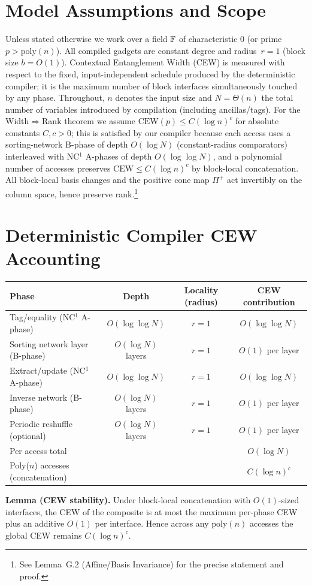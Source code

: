 \documentclass[12pt]{article}
\theoremstyle{definition}
\theoremstyle{definition}
\theoremstyle{remark}
\theoremstyle{remark}
\begin{document}

\section*{Model Assumptions and Scope}
Unless stated otherwise we work over a field $\Bbb F$ of characteristic $0$ (or prime $p>\mathrm{poly}(n)$).
All compiled gadgets are constant degree and radius~$r=1$ (block size $b=O(1)$).
Contextual Entanglement Width (CEW) is measured with respect to the fixed, input-independent schedule produced by the deterministic compiler; it is the maximum number of block interfaces simultaneously touched by any phase.
Throughout, $n$ denotes the input size and $N=\Theta(n)$ the total number of variables introduced by compilation (including ancillas/tags).
For the Width$\Rightarrow$Rank theorem we assume $\mathrm{CEW}(p)\le C(\log n)^c$ for absolute constants $C,c>0$; this is satisfied by our compiler because each access uses a sorting-network B-phase of depth $O(\log N)$ (constant-radius comparators) interleaved with NC$^1$ A-phases of depth $O(\log\log N)$, and a polynomial number of accesses preserves $\mathrm{CEW}\le C(\log n)^c$ by block-local concatenation.
All block-local basis changes and the positive cone map $\Pi^+$ act invertibly on the column space, hence preserve rank.\footnote{See Lemma~G.2 (Affine/Basis Invariance) for the precise statement and proof.}

\section*{Deterministic Compiler CEW Accounting}
\begin{center}
\begin{tabular}{lccc}
\toprule
Phase & Depth & Locality (radius) & CEW contribution \\
\midrule
Tag/equality (NC$^1$ A-phase) & $O(\log\log N)$ & $r=1$ & $O(\log\log N)$ \\
Sorting network layer (B-phase) & $O(\log N)$ layers & $r=1$ & $O(1)$ per layer \\
Extract/update (NC$^1$ A-phase) & $O(\log\log N)$ & $r=1$ & $O(\log\log N)$ \\
Inverse network (B-phase) & $O(\log N)$ layers & $r=1$ & $O(1)$ per layer \\
Periodic reshuffle (optional) & $O(\log N)$ layers & $r=1$ & $O(1)$ per layer \\
\midrule
Per access total &  &  & $O(\log N)$ \\
Poly($n$) accesses (concatenation) &  &  & $C(\log n)^c$ \\
\bottomrule
\end{tabular}
\end{center}
\noindent
\textbf{Lemma (CEW stability).} Under block-local concatenation with $O(1)$-sized interfaces, the CEW of the composite is at most the maximum per-phase CEW plus an additive $O(1)$ per interface. Hence across any $\mathrm{poly}(n)$ accesses the global CEW remains $C(\log n)^c$.
\end{document}
